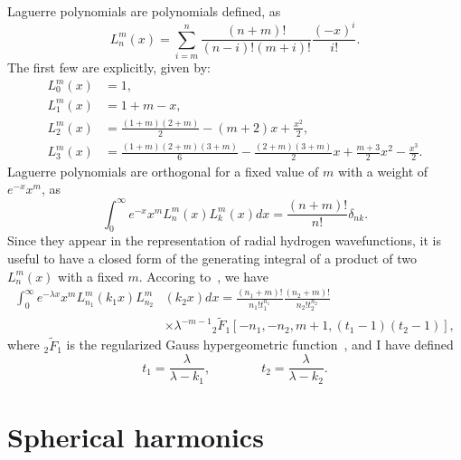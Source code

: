 Laguerre polynomials are polynomials defined, as
\begin{equation}
    L_n^m(x) =\sum_{i=m}^n \frac{(n+m)!}{(n-i)!(m+i)!}\frac{(-x)^i}{i!}.
\end{equation}
The first few are explicitly, given by:
\begin{subequations}
\begin{align}
    L_0^m(x)&=1, \\
    L_1^m(x)&=1+m-x, \\
    L_2^m(x)&=\frac{(1+m)(2+m)}{2}-(m+2)x+\frac{x^2}{2}, \\
    L_3^m(x)&=\frac{(1+m)(2+m)(3+m)}{6}-\frac{(2+m)(3+m)}{2}x+\frac{m+3}{2}x^2-\frac{x^3}{2}.
\end{align}
\end{subequations}
Laguerre polynomials are orthogonal for a fixed value of $m$ with a weight of $e^{-x}x^m$, as
\begin{equation}
    \int_{0}^\infty e^{-x}x^m L_n^m(x)L_k^m(x) dx = \frac{(n+m)!}{n!} \delta_{nk}.
\end{equation}
Since they appear in the representation of radial hydrogen wavefunctions, it is useful to have a closed form of the generating integral of a product of two $L_{n}^m(x)$ with a fixed $m$. Accoring to~\cite{LandauQM}, we have
\begin{align}
    \int_{0}^\infty e^{-\lambda x}x^{m} L_{n_1}^m(k_1x)L_{n_2}^m&(k_2x) dx = \frac{(n_1+m)!}{n_1!t_1^{n_1}} \frac{(n_2+m)!}{n_2!t_2^{n_2}} \nonumber
    \\
    &\times \lambda^{-m-1}{}_2\widetilde{F}_1\left[-n_1,-n_2,m+1,(t_1-1)(t_2-1)\right],
\end{align}
where ${}_2\widetilde{F}_1$ is the regularized Gauss hypergeometric function~\cite{AS}, and I have defined
\begin{equation}
    t_1 = \frac{\lambda}{\lambda-k_1}, \qquad \qquad t_2 = \frac{\lambda}{\lambda-k_2}.
\end{equation}

\section{Spherical harmonics}
\label{app:Harmonics}

